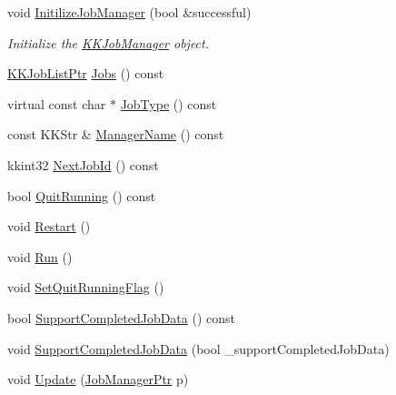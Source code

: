 \begin{DoxyCompactItemize}
\item 
void \hyperlink{class_k_k_job_managment_1_1_k_k_job_manager_aab493fed74f972ee4c337722d99f11f0}{Initilize\+Job\+Manager} (bool \&successful)
\begin{DoxyCompactList}\small\item\em Initialize the \hyperlink{class_k_k_job_managment_1_1_k_k_job_manager}{K\+K\+Job\+Manager} object. \end{DoxyCompactList}\item 
\hyperlink{namespace_k_k_job_managment_a56a0b6cdfa294a14b789c80701f456de}{K\+K\+Job\+List\+Ptr} \hyperlink{class_k_k_job_managment_1_1_k_k_job_manager_a40b441a76b4991883b0602fa1572b5cd}{Jobs} () const 
\item 
virtual const char $\ast$ \hyperlink{class_k_k_job_managment_1_1_k_k_job_manager_a7b8079c1eff3a4abe6b1e6e0f398c536}{Job\+Type} () const 
\item 
const K\+K\+Str \& \hyperlink{class_k_k_job_managment_1_1_k_k_job_manager_aaf962c9dd0f616fa86a26c620731679b}{Manager\+Name} () const 
\item 
kkint32 \hyperlink{class_k_k_job_managment_1_1_k_k_job_manager_a8e16af75eddae8f70f34715c294270ff}{Next\+Job\+Id} () const 
\item 
bool \hyperlink{class_k_k_job_managment_1_1_k_k_job_manager_a52e483d6eb7887322b456916561ce063}{Quit\+Running} () const 
\item 
void \hyperlink{class_k_k_job_managment_1_1_k_k_job_manager_a944cde4d3bee8ab244347bf3748a8b96}{Restart} ()
\item 
void \hyperlink{class_k_k_job_managment_1_1_k_k_job_manager_a5b8f7e77513d4f8ec93573df13f492cb}{Run} ()
\item 
void \hyperlink{class_k_k_job_managment_1_1_k_k_job_manager_ad132782c01b37443d0cd09eff3e7ac1c}{Set\+Quit\+Running\+Flag} ()
\item 
bool \hyperlink{class_k_k_job_managment_1_1_k_k_job_manager_ac5ac8f4eb171075ed0916bc6481ab88b}{Support\+Completed\+Job\+Data} () const 
\item 
void \hyperlink{class_k_k_job_managment_1_1_k_k_job_manager_ade9a9d72896fe1538c41aa80243525f0}{Support\+Completed\+Job\+Data} (bool \+\_\+support\+Completed\+Job\+Data)
\item 
void \hyperlink{class_k_k_job_managment_1_1_k_k_job_manager_a4ef8fcf26a2ab885b4d984f2569eb4ef}{Update} (\hyperlink{class_k_k_job_managment_1_1_k_k_job_manager_a3e186b42e759f71ceb6f3d04f4e8f74d}{Job\+Manager\+Ptr} p)
\end{DoxyCompactItemize}
